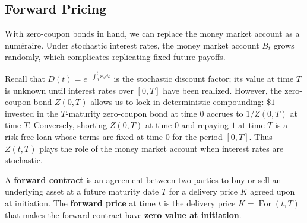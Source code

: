 \subsection{Forward Pricing}
With zero-coupon bonds in hand, we can replace the money market account as a num\'eraire. Under stochastic interest rates, the money market account $B_t$ grows randomly, which complicates replicating fixed future payoffs.

Recall that $D(t) = e^{-\int_0^t r_s\dd s}$ is the stochastic discount factor; its value at time $T$ is unknown until interest rates over $[0, T]$ have been realized. However, the zero-coupon bond $Z(0, T)$ allows us to lock in deterministic compounding: $\$1$ invested in the $T$-maturity zero-coupon bond at time $0$ accrues to $1 / Z(0, T)$ at time $T$. Conversely, shorting $Z(0, T)$ at time $0$ and repaying $1$ at time $T$ is a risk-free loan whose terms are fixed at time $0$ for the period $[0, T]$. Thus $Z(t, T)$ plays the role of the money market account when interest rates are stochastic.

\begin{definition}\label{def:forward-contract}
    A \textbf{forward contract} is an agreement between two parties to buy or sell an underlying asset at a future maturity date $T$ for a delivery price $K$ agreed upon at initiation. The \textbf{forward price} at time $t$ is the delivery price $K = \operatorname{For}(t, T)$ that makes the forward contract have \textbf{zero value at initiation}.
\end{definition}

